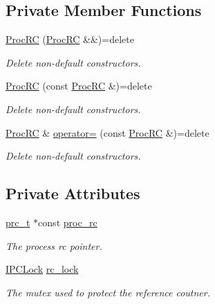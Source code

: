 \subsection*{Private Member Functions}
\begin{DoxyCompactItemize}
\item 
\hyperlink{class_proc_r_c_a59f158e2dc9b70a8ef59753db84b81b5}{Proc\+RC} (\hyperlink{class_proc_r_c}{Proc\+RC} \&\&)=delete
\begin{DoxyCompactList}\small\item\em Delete non-\/default constructors. \end{DoxyCompactList}\item 
\hyperlink{class_proc_r_c_a3b1ea79bd4591511fb1808d36c7493ac}{Proc\+RC} (const \hyperlink{class_proc_r_c}{Proc\+RC} \&)=delete
\begin{DoxyCompactList}\small\item\em Delete non-\/default constructors. \end{DoxyCompactList}\item 
\hyperlink{class_proc_r_c}{Proc\+RC} \& \hyperlink{class_proc_r_c_a58ddcf9743582319b41fe2bd88e1dbc5}{operator=} (const \hyperlink{class_proc_r_c}{Proc\+RC} \&)=delete
\begin{DoxyCompactList}\small\item\em Delete non-\/default constructors. \end{DoxyCompactList}\end{DoxyCompactItemize}
\subsection*{Private Attributes}
\begin{DoxyCompactItemize}
\item 
\hyperlink{proc__rc_8hpp_a4e61911b35a8dfa15356d5296f46d87a}{prc\+\_\+t} $\ast$const \hyperlink{class_proc_r_c_acf0eb4d339c6f39d5574a9bfa0048e07}{proc\+\_\+rc}
\begin{DoxyCompactList}\small\item\em The process rc pointer. \end{DoxyCompactList}\item 
\hyperlink{class_i_p_c_lock}{I\+P\+C\+Lock} \hyperlink{class_proc_r_c_a37de2551af458d21bdb7291ba02fabb4}{rc\+\_\+lock}
\begin{DoxyCompactList}\small\item\em The mutex used to protect the reference coutner. \end{DoxyCompactList}\end{DoxyCompactItemize}

